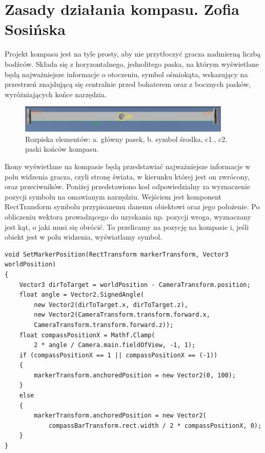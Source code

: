 \section{Zasady działania kompasu. Zofia Sosińska}\label{chap:naw}

Projekt kompasu jest na tyle prosty, aby nie przytłoczyć gracza nadmierną liczbą bodźców. Składa się z horyzontalnego, jednolitego paska, na którym wyświetlane będą najważniejsze informacje o otoczeniu, symbol ośmiokąta, wskazujący na przestrzeń znajdującą się centralnie przed bohaterem oraz z bocznych pasków, wyróżniających końce narzędzia.

\begin{figure}[htbp]
    \centering
    \includegraphics[width=0.9\textwidth]{images/ui/opis_ekementow_kompasu.png}
    \caption{Rozpiska elementów: a. główny pasek, b. symbol środka, c1., c2. paski końców kompasu.}\label{fig:compass_design}
\end{figure}

Ikony wyświetlane na kompasie będą przedstawiać najważniejsze informacje w polu widzenia gracza, czyli stronę świata, w kierunku której jest on zwrócony, oraz przeciwników.
Poniżej przedstawiono kod odpowiedzialny za wyznaczenie pozycji symbolu na omawianym narzędziu. Wejściem jest komponent RectTransform symbolu przypisanemu danemu obiektowi oraz jego położenie. Po obliczeniu wektora prowadzącego do uzyskania np. pozycji wroga, wyznaczany jest kąt, o jaki musi się obrócić. To przelicamy na pozycję na kompasie i, jeśli obiekt jest w polu widzenia, wyświatlamy symbol.

\begin{lstlisting}[caption=Fragment kodu odpowiedzialny za ustawienie symbolu na pasku kompasu]
void SetMarkerPosition(RectTransform markerTransform, Vector3 worldPosition)
{
    Vector3 dirToTarget = worldPosition - CameraTransform.position;
    float angle = Vector2.SignedAngle(
        new Vector2(dirToTarget.x, dirToTarget.z), 
        new Vector2(CameraTransform.transform.forward.x, 
        CameraTransform.transform.forward.z));
    float compassPositionX = Mathf.Clamp(
        2 * angle / Camera.main.fieldOfView, -1, 1);
    if (compassPositionX == 1 || compassPositionX == (-1))
    {
        markerTransform.anchoredPosition = new Vector2(0, 100);
    }
    else
    {
        markerTransform.anchoredPosition = new Vector2(
            compassBarTransform.rect.width / 2 * compassPositionX, 0);
    }
}
\end{lstlisting}

